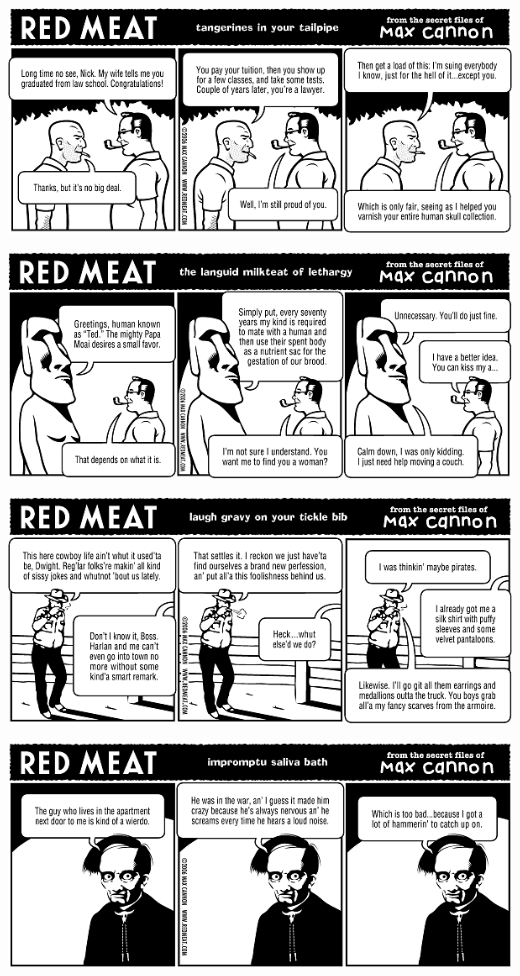 \documentclass[a4paper,twoside,11pt]{article}
\begin{document}
\includegraphics[width=\textwidth]{redmeat_2006-07-04.png}



\includegraphics[width=\textwidth]{redmeat_2006-07-11.png}



\includegraphics[width=\textwidth]{redmeat_2006-07-18.png}



\includegraphics[width=\textwidth]{redmeat_2006-07-25.png}
\end{document}
